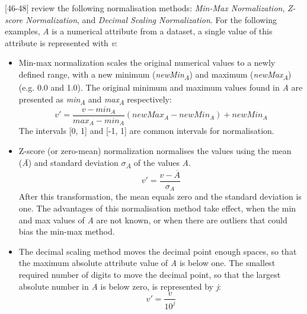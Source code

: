 \textcite{dataPreprocessingInDataMining}[46-48] review the following normalisation methods: \textit{Min-Max Normalization}, \textit{Z-score Normalization}, and \textit{Decimal Scaling Normalization}. For the following examples, \textit{A} is a numerical attribute from a dataset, a single value of this attribute is represented with \textit{v}:
\begin{itemize}
  \item Min-max normalization scales the original numerical values to a newly defined range, with a new minimum (\textit{newMin\textsubscript{A}}) and maximum (\textit{newMax\textsubscript{A}}) (e.g. 0.0 and 1.0). The original minimum and maximum values found in \textit{A} are presented as \textit{min\textsubscript{A}} and \textit{max\textsubscript{A}} respectively:
  \[
    v' = \frac{v - min_A}{max_A - min_A}(newMax_A - newMin_A) + newMin_A
  \]
  The intervals [0, 1] and [-1, 1] are common intervals for normalisation. 

  \item Z-score (or zero-mean) normalization normalises the values using the mean (\textit{\={A}}) and standard deviation \textit{$\sigma$\textsubscript{A}} of the values \textit{A}.
  \[
    v' = \frac{v - \overline{A}}{\sigma_A}
  \]
  After this transformation, the mean equals zero and the standard deviation is one. The advantages of this normalisation method take effect, when the min and max values of \textit{A} are not known, or when there are outliers that could bias the min-max method.

  \item The decimal scaling method moves the decimal point enough spaces, so that the maximum absolute attribute value of \textit{A} is below one. The smallest required number of digits to move the decimal point, so that the largest absolute number in \textit{A} is below zero, is represented by \textit{j}:
  \[
    v' = \frac{v}{10^j}
  \]
\end{itemize}
